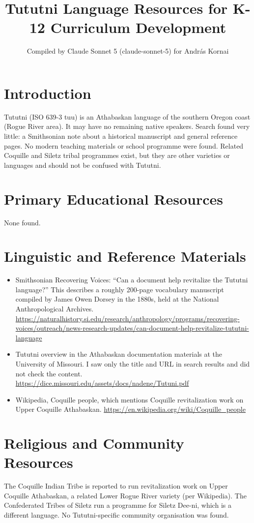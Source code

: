 \documentclass[12pt]{article}
\title{Tututni Language Resources for K-12 Curriculum Development}
\author{Compiled by Claude Sonnet 5 (claude-sonnet-5) for Andr\'as Kornai}
\date{}
\begin{document}
\maketitle

\section{Introduction}
Tututni (ISO 639-3 tuu) is an Athabaskan language of the southern Oregon coast (Rogue River area). It may have no remaining native speakers. Search found very little: a Smithsonian note about a historical manuscript and general reference pages. No modern teaching materials or school programme were found. Related Coquille and Siletz tribal programmes exist, but they are other varieties or languages and should not be confused with Tututni.

\section{Primary Educational Resources}
None found.

\section{Linguistic and Reference Materials}
\begin{itemize}
\item Smithsonian Recovering Voices: ``Can a document help revitalize the Tututni language?'' This describes a roughly 200-page vocabulary manuscript compiled by James Owen Dorsey in the 1880s, held at the National Anthropological Archives. \url{https://naturalhistory.si.edu/research/anthropology/programs/recovering-voices/outreach/news-research-updates/can-document-help-revitalize-tututni-language}
\item Tututni overview in the Athabaskan documentation materials at the University of Missouri. I saw only the title and URL in search results and did not check the content. \url{https://dice.missouri.edu/assets/docs/nadene/Tutuni.pdf}
\item Wikipedia, Coquille people, which mentions Coquille revitalization work on Upper Coquille Athabaskan. \url{https://en.wikipedia.org/wiki/Coquille_people}
\end{itemize}

\section{Religious and Community Resources}
The Coquille Indian Tribe is reported to run revitalization work on Upper Coquille Athabaskan, a related Lower Rogue River variety (per Wikipedia). The Confederated Tribes of Siletz run a programme for Siletz Dee-ni, which is a different language. No Tututni-specific community organisation was found.
\end{document}

